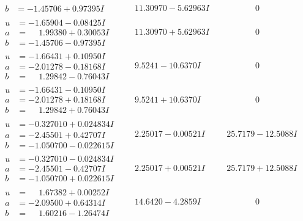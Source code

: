 \documentclass[1p]{elsarticle_modified}
\theoremstyle{definition}
\begin{document}
$$\begin{array}{c|c|c}
\begin{aligned}
b &= -1.45706 + 0.97395 I\end{aligned}
 & \phantom{-}11.30970 - 5.62963 I & \phantom{-0.000000 } 0 \\ \hline\begin{aligned}
u &= -1.65904 - 0.08425 I \\
a &= \phantom{-}1.99380 + 0.30053 I \\
b &= -1.45706 - 0.97395 I\end{aligned}
 & \phantom{-}11.30970 + 5.62963 I & \phantom{-0.000000 } 0 \\ \hline\begin{aligned}
u &= -1.66431 + 0.10950 I \\
a &= -2.01278 - 0.18168 I \\
b &= \phantom{-}1.29842 - 0.76043 I\end{aligned}
 & \phantom{-}9.5241 - 10.6370 I & \phantom{-0.000000 } 0 \\ \hline\begin{aligned}
u &= -1.66431 - 0.10950 I \\
a &= -2.01278 + 0.18168 I \\
b &= \phantom{-}1.29842 + 0.76043 I\end{aligned}
 & \phantom{-}9.5241 + 10.6370 I & \phantom{-0.000000 } 0 \\ \hline\begin{aligned}
u &= -0.327010 + 0.024834 I \\
a &= -2.45501 + 0.42707 I \\
b &= -1.050700 - 0.022615 I\end{aligned}
 & \phantom{-}2.25017 - 0.00521 I & \phantom{-}25.7179 - 12.5088 I \\ \hline\begin{aligned}
u &= -0.327010 - 0.024834 I \\
a &= -2.45501 - 0.42707 I \\
b &= -1.050700 + 0.022615 I\end{aligned}
 & \phantom{-}2.25017 + 0.00521 I & \phantom{-}25.7179 + 12.5088 I \\ \hline\begin{aligned}
u &= \phantom{-}1.67382 + 0.00252 I \\
a &= -2.09500 + 0.64314 I \\
b &= \phantom{-}1.60216 - 1.26474 I\end{aligned}
 & \phantom{-}14.6420 - 4.2859 I & \phantom{-0.000000 } 0 \\ \hline\begin{aligned}

\end{aligned}
\end{array}$$
\end{document}
